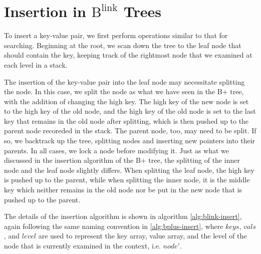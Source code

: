 \documentclass[11pt]{report}
\theoremstyle{definition}
\begin{document}
\section{Insertion in $\text{B}^{\text{link}}$ Trees}
\label{sec:blink-insert}

To insert a key-value pair, we first perform operations similar to that for searching. Beginning at the root, we scan down the tree to the leaf node that should contain the key, keeping track of the rightmost node that we examined at each level in a stack.

The insertion of the key-value pair into the leaf node may necessitate splitting the node. In this case, we split the node as what we have seen in the B+ tree, with the addition of changing the high key. The high key of the new node is set to the high key of the old node, and the high key of the old node is set to the last key that remains in the old node after splitting, which is then pushed up to the parent node recoreded in the stack. The parent node, too, may need to be split. If so, we backtrack up the tree, splitting nodes and inserting new pointers into their parents. In all cases, we lock a node before modifying it. Just as what we discussed in the insertion algorithm of the B+ tree, the splitting of the inner node and the leaf node slightly differs. When splitting the leaf node, the high key is pushed up to the parent, while when splitting the inner node, it is the middle key which neither remains in the old node nor be put in the new node that is pushed up to the parent.

The details of the insertion algorithm is shown in algorithm \ref{alg:blink-insert}, again following the same naming convention in \ref{alg:bplus-insert}, where $keys$, $vals$, and $level$ are used to represent the key array, value array, and the level of the node that is currently examined in the context, i.e. $node'$.
\end{document}
